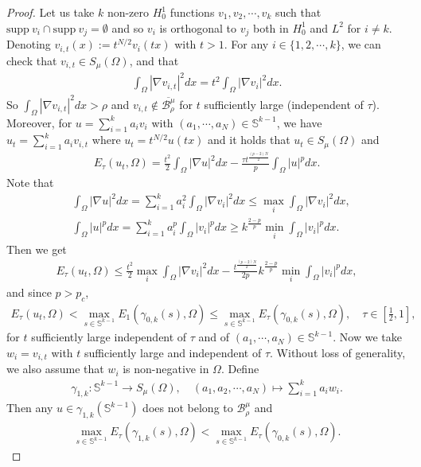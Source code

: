 \documentclass[10pt,a4paper]{article}
\theoremstyle{definition} \theoremstyle{remark}
\numberwithin{equation}{section}
\newcommand{\B}{\mathcal{B}}
\newcommand{\s}{\mathbb{S}}
\begin{document}
\begin{proof}
	Let us take $k$ non-zero $H_0^1$ functions $v_1, v_2, \cdots, v_k$ such that $\text{supp} \ v_i \cap \text{supp} \ v_j = \emptyset$ and so $v_i$ is orthogonal to $v_j$ both in $H_0^1$ and $L^2$ for $i \neq k$. Denoting $v_{i,t}(x) := t^{N/2}v_i(tx)$ with $t > 1$. For any $i \in \{1,2,\cdots,k\}$, we can check that $v_{i,t} \in S_\mu(\Omega)$, and that
	\begin{align*}
		\int_\Omega|\nabla v_{i,t}|^2dx = t^2\int_\Omega|\nabla v_i|^2dx.
	\end{align*}
	So $\int_\Omega|\nabla v_{i,t}|^2dx > \rho$ and $v_{i,t} \notin \overline{\B_\rho^\mu}$ for $t$ sufficiently large (independent of $\tau$). Moreover, for $u = \sum_{i=1}^k a_iv_i$ with $(a_1,\cdots,a_N) \in \s^{k-1}$, we have $u_t = \sum_{i=1}^k a_iv_{i,t}$ where $u_t = t^{N/2}u(tx)$ and it holds that $u_t \in S_\mu(\Omega)$ and
	\begin{align*}
		E_\tau(u_t,\Omega) = \frac {t^2}2\int_\Omega|\nabla u|^2dx - \frac{\tau t^{\frac{(p-2)N}2}}p\int_\Omega|u|^pdx.
	\end{align*}
	Note that
	\begin{align*}
		& \int_\Omega|\nabla u|^2dx = \sum_{i=1}^k a_i^2 \int_\Omega|\nabla v_i|^2dx \leq \max_i \int_\Omega|\nabla v_i|^2dx, \\
		& \int_\Omega|u|^pdx = \sum_{i=1}^k a_i^p \int_\Omega|v_i|^pdx \geq k^{\frac{2-p}{p}}\min_i \int_\Omega|v_i|^pdx.
	\end{align*}
	Then we get
	\begin{align*}
		E_\tau(u_t,\Omega) \le \frac {t^2}2\max_i \int_\Omega|\nabla v_i|^2dx - \frac{ t^{\frac{(p-2)N}2}}{2p}k^{\frac{2-p}{p}}\min_i \int_\Omega|v_i|^pdx,
	\end{align*}
    and since $p > p_c$,
	\begin{align*}
		E_\tau(u_t,\Omega) < \max_{s \in \s^{k-1}}E_1(\gamma_{0,k}(s),\Omega) \leq \max_{s \in \s^{k-1}}E_\tau(\gamma_{0,k}(s),\Omega), \quad \tau \in [\frac12,1],
	\end{align*}
	for $t$ sufficiently large independent of $\tau$ and of $(a_1,\cdots,a_N) \in \s^{k-1}$. Now we take $w_i = v_{i,t}$ with $t$ sufficiently large and independent of $\tau$. Without loss of generality, we also assume that $w_i$ is non-negative in $\Omega$. Define
	\begin{align*}
		\gamma_{1,k}: \s^{k-1} \to S_\mu(\Omega), \quad (a_1,a_2,\cdots,a_N) \mapsto \sum_{i=1}^ka_iw_i.
	\end{align*}
	Then any $u \in \gamma_{1,k}(\s^{k-1})$ does not belong to $\B_{\rho}^\mu$ and
	\begin{align} \label{eqmaxsn-1two}
		\max_{s \in \s^{k-1}}E_\tau(\gamma_{1,k}(s),\Omega) < \max_{s \in \s^{k-1}}E_\tau(\gamma_{0,k}(s),\Omega).
	\end{align}
	

\end{proof}
\end{document}
